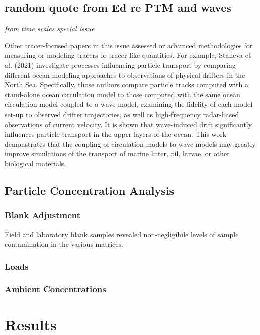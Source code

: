 \documentclass[draft]{jgr/agujournal2019}
\begin{document}
\subsection{random quote from Ed re PTM and waves}

{\em from time scales special issue}

Other tracer-focused papers in this issue assessed or advanced
methodologies for measuring or modeling tracers or tracer-like
quantities. For example, Staneva et al. (2021) investigate processes
influencing particle transport by comparing different ocean-modeling
approaches to observations of physical drifters in the North
Sea. Specifically, those authors compare particle tracks computed with
a stand-alone ocean circulation model to those computed with the same
ocean circulation model coupled to a wave model, examining the
fidelity of each model set-up to observed drifter trajectories, as
well as high-frequency radar-based observations of current
velocity. It is shown that wave-induced drift significantly influences
particle transport in the upper layers of the ocean. This work
demonstrates that the coupling of circulation models to wave models
may greatly improve simulations of the transport of marine litter,
oil, larvae, or other biological materials.


\subsection{Particle Concentration Analysis}



\subsubsection{Blank Adjustment}

Field and laboratory blank samples revealed non-negligibile levels
of sample contamination in the various matrices.

\subsubsection{Loads}

\subsubsection{Ambient Concentrations}

\section{Results}
\end{document}
